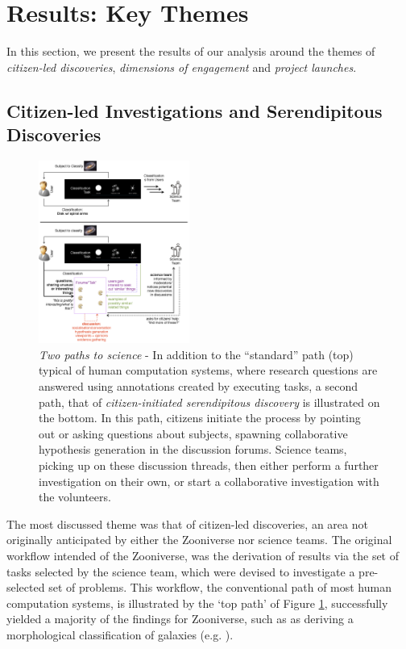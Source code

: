 \documentclass{sigchi}
\begin{document}
\section{Results: Key Themes}
In this section, we present the results of our analysis around the themes of \emph{citizen-led discoveries}, \emph{dimensions of engagement} and \emph{project launches}.

\subsection{Citizen-led Investigations and Serendipitous Discoveries}

\begin{figure}[htbp]
\centering
\includegraphics[width=0.44\textwidth]{imgs/twopaths.png}
\caption{\emph{Two paths to science} - In addition to the ``standard'' path (top) typical of human computation systems, where research questions are answered using annotations created by executing tasks, a second path, that of \emph{citizen-initiated serendipitous discovery} is illustrated on the bottom.  In this path, citizens initiate the process by pointing out or asking questions about subjects, spawning collaborative hypothesis generation in the discussion forums. Science teams, picking up on these discussion threads, then either perform a further investigation on their own, or start a collaborative investigation with the volunteers.}
\label{fig:twopaths}
\end{figure}

The most discussed theme was that of citizen-led discoveries, an area not originally anticipated by either the Zooniverse nor science teams.  The original workflow intended of the Zooniverse, was the derivation of results via the set of tasks selected by the science team, which were devised to investigate a pre-selected set of problems.  This workflow, the conventional path of most human computation systems, is illustrated by the `top path' of Figure \ref{fig:twopaths}, successfully yielded a majority of the findings for Zooniverse, such as as deriving a morphological classification of galaxies (e.g. \cite{fortson2011galaxy}).   
\end{document}
